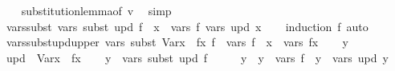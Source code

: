 \begin{isabellebody}
%
\isadelimproof
\ \ %
\endisadelimproof
%
\isatagproof
{}\isamarkupfalse%
\ substitution{\isacharunderscore}{\kern0pt}lemma{\isacharbrackleft}{\kern0pt}of\ v{\isacharbrackright}{\kern0pt}\ \isamarkupfalse%
\ simp%
\endisatagproof
{\isafoldproof}%
%
\isadelimproof
\isanewline
%
\endisadelimproof
\isanewline
{}\isamarkupfalse%
\ vars{\isacharunderscore}{\kern0pt}subst{\isacharcolon}{\kern0pt}\ {\isachardoublequoteopen}vars\ {\isacharparenleft}{\kern0pt}subst\ upd\ f{\isacharparenright}{\kern0pt}\ {\isacharequal}{\kern0pt}\ {\isacharparenleft}{\kern0pt}{\isasymUnion}x\ {\isasymin}\ vars\ f{\isachardot}{\kern0pt}\ vars\ {\isacharparenleft}{\kern0pt}upd\ x{\isacharparenright}{\kern0pt}{\isacharparenright}{\kern0pt}{\isachardoublequoteclose}\isanewline
%
\isadelimproof
\ \ %
\endisadelimproof
%
\isatagproof
{}\isamarkupfalse%
\ {\isacharparenleft}{\kern0pt}induction\ f{\isacharparenright}{\kern0pt}\ auto%
\endisatagproof
{\isafoldproof}%
%
\isadelimproof
\isanewline
%
\endisadelimproof
\isanewline
{}\isamarkupfalse%
\ vars{\isacharunderscore}{\kern0pt}subst{\isacharunderscore}{\kern0pt}upd{\isacharunderscore}{\kern0pt}upper{\isacharcolon}{\kern0pt}\ {\isachardoublequoteopen}vars\ {\isacharparenleft}{\kern0pt}subst\ {\isacharparenleft}{\kern0pt}Var{\isacharparenleft}{\kern0pt}x\ {\isacharcolon}{\kern0pt}{\isacharequal}{\kern0pt}\ fx{\isacharparenright}{\kern0pt}{\isacharparenright}{\kern0pt}\ f{\isacharparenright}{\kern0pt}\ {\isasymsubseteq}\ vars\ f\ {\isacharminus}{\kern0pt}\ {\isacharbraceleft}{\kern0pt}x{\isacharbraceright}{\kern0pt}\ {\isasymunion}\ vars\ fx{\isachardoublequoteclose}\isanewline
%
\isadelimproof
%
\endisadelimproof
%
\isatagproof
{}\isamarkupfalse%
\isanewline
\ \ \isamarkupfalse%
\ y\isanewline
\ \ \isamarkupfalse%
\ {\isacharquery}{\kern0pt}upd\ {\isacharequal}{\kern0pt}\ {\isachardoublequoteopen}Var{\isacharparenleft}{\kern0pt}x\ {\isacharcolon}{\kern0pt}{\isacharequal}{\kern0pt}\ fx{\isacharparenright}{\kern0pt}{\isachardoublequoteclose}\isanewline
\ \ \isamarkupfalse%
\ {\isachardoublequoteopen}y\ {\isasymin}\ vars\ {\isacharparenleft}{\kern0pt}subst\ {\isacharquery}{\kern0pt}upd\ f{\isacharparenright}{\kern0pt}{\isachardoublequoteclose}\isanewline
\ \ \isamarkupfalse%
\ \isamarkupfalse%
\ y{\isacharprime}{\kern0pt}\ \ {\isachardoublequoteopen}y{\isacharprime}{\kern0pt}\ {\isasymin}\ vars\ f\ {\isasymand}\ y\ {\isasymin}\ vars\ {\isacharparenleft}{\kern0pt}{\isacharquery}{\kern0pt}upd\ y{\isacharprime}{\kern0pt}{\isacharparenright}{\kern0pt}{\isachardoublequoteclose}\ \isamarkupfalse%

\end{isabellebody}
